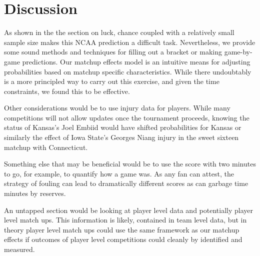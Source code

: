 \section{Discussion}
As shown in the the section on luck, chance coupled with a relatively small sample size makes this NCAA prediction a difficult task.  Nevertheless, we provide some sound methods and techniques for filling out a bracket or making game-by-game predictions.  Our matchup effects model is an intuitive means for adjusting probabilities based on matchup specific characteristics.  While there undoubtably is a more principled way to carry out this exercise, and given the time constraints, we found this to be effective.

Other considerations would be to use injury data for players.  While many competitions will not allow updates once the tournament proceeds, knowing the status of Kansas's Joel Embiid would have shifted probabilities for Kansas or similarly the effect of Iowa State's Georges Niang injury in the sweet sixteen matchup with Connecticut.

Something else that may be beneficial would be to use the score with two minutes to go, for example, to quantify how a game was.  As any fan can attest, the strategy of fouling can lead to dramatically different scores as can garbage time minutes by reserves. 

An untapped section would be looking at player level data and potentially player level match ups.  This information is likely, contained in team level data, but in theory player level match ups could use the same framework as our matchup effects if outcomes of player level competitions could cleanly by identified and measured.
